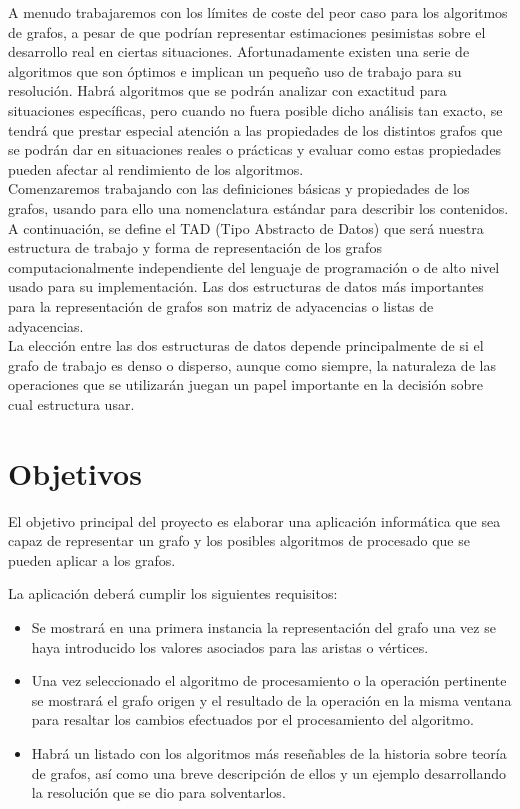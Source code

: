 A menudo trabajaremos con los límites de coste del peor caso para los algoritmos de grafos, a pesar de que podrían representar estimaciones pesimistas sobre el desarrollo real en ciertas situaciones. Afortunadamente existen una serie de algoritmos que son óptimos e implican un pequeño uso de trabajo para su resolución. Habrá algoritmos que se podrán analizar con exactitud para situaciones específicas, pero cuando no fuera posible dicho análisis tan exacto, se tendrá que prestar especial atención a las propiedades de los distintos grafos que se podrán dar en situaciones reales o prácticas y evaluar como estas propiedades pueden afectar al rendimiento de los algoritmos.\\

Comenzaremos trabajando con las definiciones básicas y propiedades de los grafos, usando para ello una nomenclatura estándar para describir los contenidos. A continuación, se define el TAD (Tipo Abstracto de Datos) que será nuestra estructura de trabajo y forma de representación de los grafos computacionalmente independiente del lenguaje de programación o de alto nivel usado para su implementación. Las dos estructuras de datos más importantes para la representación de grafos son matriz de adyacencias o listas de adyacencias.\\

La elección entre las dos estructuras de datos depende principalmente de si el grafo de trabajo es denso o disperso, aunque como siempre, la naturaleza de las operaciones que se utilizarán juegan un papel importante en la decisión sobre cual estructura usar.\\

\section{Objetivos}

El objetivo principal del proyecto es elaborar una aplicación informática que sea capaz de representar un grafo y los posibles algoritmos de procesado que se pueden aplicar a los grafos.

La aplicación deberá cumplir los siguientes requisitos:

\begin{itemize}
\item Se mostrará en una primera instancia la representación del grafo una vez se haya introducido los valores asociados para las aristas o vértices.

\item Una vez seleccionado el algoritmo de procesamiento o la operación pertinente se mostrará el grafo origen y el resultado de la operación en la misma ventana para resaltar los cambios efectuados por el procesamiento del algoritmo.

\item Habrá un listado con los algoritmos más reseñables de la historia sobre teoría de grafos, así como una breve descripción de ellos y un ejemplo desarrollando la resolución que se dio para solventarlos. 

\end{itemize}

